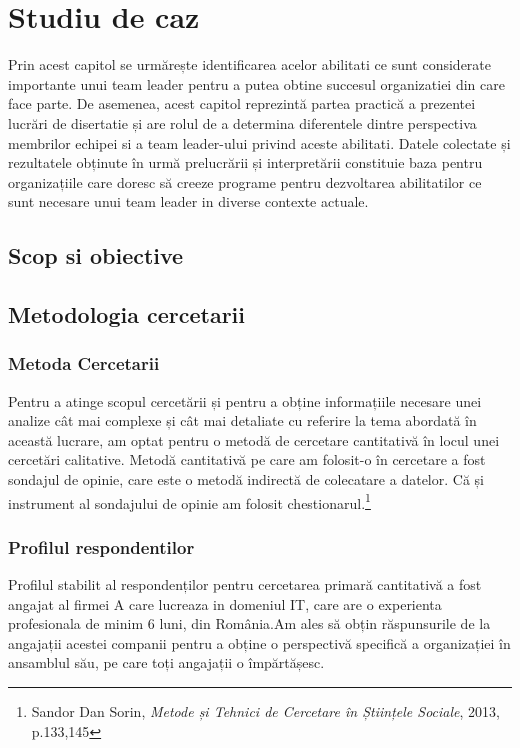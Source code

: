 \documentclass[a4paper, 12pt]{article}
\begin{document}
\setcounter{section}{2}
	\section{Studiu de caz }

	\quad\quad Prin acest capitol se urmărește identificarea acelor abilitati ce sunt  considerate importante unui team leader pentru a putea obtine succesul organizatiei din care face parte. De asemenea, acest capitol reprezintă partea practică a prezentei lucrări de disertatie și are rolul de a determina diferentele dintre perspectiva membrilor echipei si a team leader-ului privind  aceste abilitati. Datele colectate și rezultatele obținute în urmă prelucrării și interpretării constituie baza pentru organizațiile care doresc să creeze programe pentru dezvoltarea abilitatilor ce sunt necesare unui team leader in diverse contexte actuale.

	\subsection{Scop si obiective}

	\subsection{Metodologia cercetarii}
		\subsubsection{Metoda Cercetarii}
	\qquad\space Pentru a atinge scopul cercetării și pentru a obține informațiile necesare unei analize cât mai complexe și cât mai detaliate cu referire la tema abordată în această lucrare, am optat pentru o metodă de cercetare cantitativă în locul unei cercetări calitative.
	\quad Metodă cantitativă pe care am folosit-o în cercetare a fost sondajul de opinie, care este o metodă indirectă de colecatare a datelor. Că și instrument al sondajului de opinie am folosit chestionarul.\footnote{Sandor Dan Sorin, \textit{Metode și Tehnici de Cercetare în Științele Sociale}, 2013, p.133,145}
		\subsubsection{Profilul respondentilor}
	\quad Profilul stabilit al respondenților pentru cercetarea primară cantitativă a fost angajat al firmei A care lucreaza in domeniul IT, care are  o experienta profesionala de minim 6 luni, din România.Am ales să obțin răspunsurile de la angajații acestei companii pentru a obține o perspectivă specifică a organizației în ansamblul său, pe care toți angajații o împărtășesc.
\end{document}
